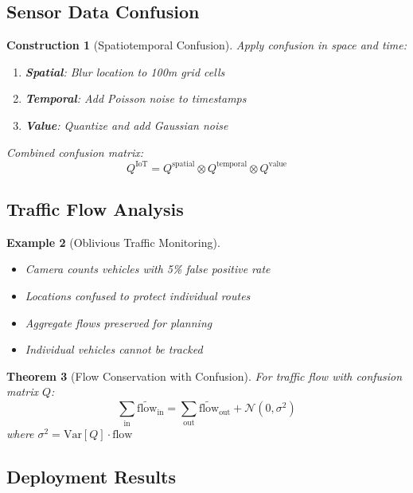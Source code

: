 \documentclass[11pt,final]{article}
\newcommand{\observed}[1]{\tilde{#1}}
\newtheorem{theorem}{Theorem}[section]
\newtheorem{example}[theorem]{Example}
\newtheorem{construction}[theorem]{Construction}
\begin{document}
\subsection{Sensor Data Confusion}

\begin{construction}[Spatiotemporal Confusion]
Apply confusion in space and time:
\begin{enumerate}
    \item \textbf{Spatial}: Blur location to 100m grid cells
    \item \textbf{Temporal}: Add Poisson noise to timestamps
    \item \textbf{Value}: Quantize and add Gaussian noise
\end{enumerate}

Combined confusion matrix:
\begin{equation}
Q^{\text{IoT}} = Q^{\text{spatial}} \otimes Q^{\text{temporal}} \otimes Q^{\text{value}}
\end{equation}
\end{construction}

\subsection{Traffic Flow Analysis}

\begin{example}[Oblivious Traffic Monitoring]
\begin{itemize}
    \item Camera counts vehicles with 5\% false positive rate
    \item Locations confused to protect individual routes
    \item Aggregate flows preserved for planning
    \item Individual vehicles cannot be tracked
\end{itemize}
\end{example}

\begin{theorem}[Flow Conservation with Confusion]
For traffic flow with confusion matrix $Q$:
\begin{equation}
\sum_{\text{in}} \observed{\text{flow}}_{\text{in}} = \sum_{\text{out}} \observed{\text{flow}}_{\text{out}} + \mathcal{N}(0, \sigma^2)
\end{equation}
where $\sigma^2 = \text{Var}[Q] \cdot \text{flow}$
\end{theorem}

\subsection{Deployment Results}
\end{document}
